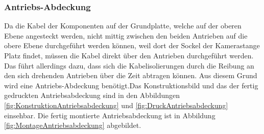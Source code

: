 \subsubsection{Antriebs-Abdeckung}\label{Sec2Sub2SubSub7}

Da die Kabel der Komponenten auf der Grundplatte, welche auf der oberen Ebene angesteckt werden, nicht mittig zwischen den beiden Antrieben auf die obere Ebene durchgeführt werden können, weil dort der Sockel der Kamerastange Platz findet, müssen die Kabel direkt über den Antrieben durchgeführt werden. Das führt allerdings dazu, dass sich die Kabelisolierungen durch die Reibung an den sich drehenden Antrieben über die Zeit abtragen können. Aus diesem Grund wird eine Antriebs-Abdeckung benötigt.Das Konstruktionsbild und das der fertig gedruckten Antriebsabdeckung sind in den Abbildungen  \ref{fig:KonstruktionAntriebsabdeckung} und \ref{fig:DruckAntriebsabdeckung} einsehbar. Die fertig montierte Antriebsabdeckung ist in Abbildung \ref{fig:MontageAntriebsabdeckung} abgebildet.

